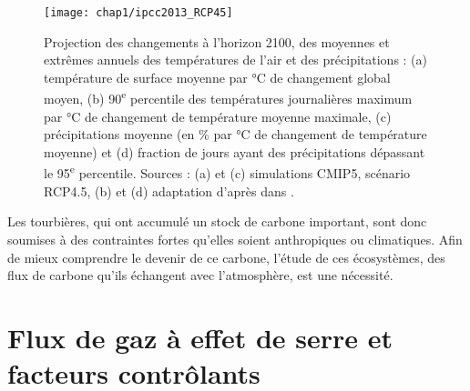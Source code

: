 


\begin{figure}
\centering
\texttt{[image: chap1/ipcc2013\_RCP45]}
\caption{Projection des changements à l'horizon 2100, des moyennes et extrêmes annuels des températures de l'air et des précipitations : (a) température de surface moyenne par \si{\degreeCelsius} de changement global moyen, (b) 90\textsuperscript{e} percentile des températures journalières maximum par \si{\degreeCelsius} de changement de température moyenne maximale, (c) précipitations moyenne (en \si{\percent} par \si{\degreeCelsius} de changement de température moyenne) et (d) fraction de jours ayant des précipitations dépassant le 95\textsuperscript{e} percentile. Sources : (a) et (c) simulations CMIP5, scénario RCP4.5, (b) et (d) adaptation d'après \citet{orlowsky2012} dans \cite{christensen2013}.}
\label{fig:ipcc2013_T_rain}
\end{figure}


Les tourbières, qui ont accumulé un stock de carbone important, sont donc soumises à des contraintes fortes qu'elles soient anthropiques ou climatiques.
Afin de mieux comprendre le devenir de ce carbone, l'étude de ces écosystèmes, des flux de carbone qu'ils échangent avec l'atmosphère, est une nécessité.


\section{Flux de gaz à effet de serre et facteurs contrôlants}

